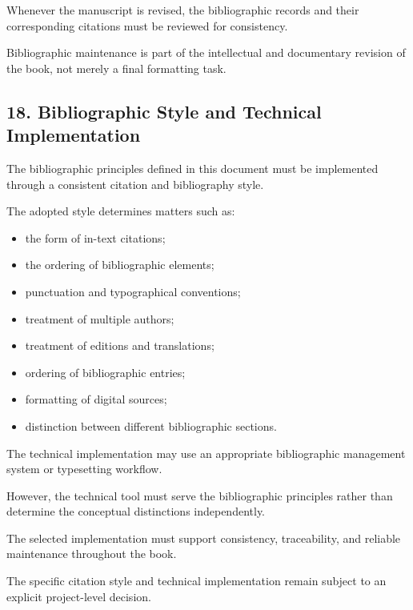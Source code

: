 Whenever the manuscript
is revised, the
bibliographic records
and their corresponding
citations must be
reviewed for consistency.

Bibliographic maintenance
is part of the intellectual
and documentary revision
of the book, not merely
a final formatting task.


\subsection*{18. Bibliographic Style and
Technical Implementation}

The bibliographic principles
defined in this document
must be implemented
through a consistent
citation and bibliography
style.

The adopted style
determines matters such as:

\begin{itemize}
    \item the form of
    in-text citations;
    \item the ordering
    of bibliographic
    elements;
    \item punctuation
    and typographical
    conventions;
    \item treatment of
    multiple authors;
    \item treatment of
    editions and translations;
    \item ordering of
    bibliographic entries;
    \item formatting of
    digital sources;
    \item distinction
    between different
    bibliographic sections.
\end{itemize}

The technical implementation
may use an appropriate
bibliographic management
system or typesetting
workflow.

However, the technical
tool must serve the
bibliographic principles
rather than determine
the conceptual distinctions
independently.

The selected implementation
must support consistency,
traceability, and reliable
maintenance throughout
the book.

The specific citation
style and technical
implementation remain
subject to an explicit
project-level decision.

